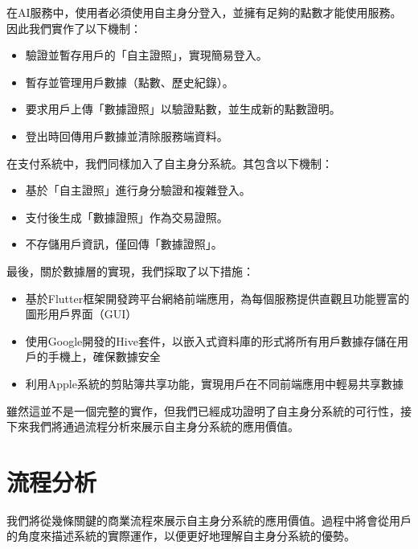 在AI服務中，使用者必須使用自主身分登入，並擁有足夠的點數才能使用服務。因此我們實作了以下機制：
\begin{itemize}
  \item 驗證並暫存用戶的「自主證照」，實現簡易登入。
  \item 暫存並管理用戶數據（點數、歷史紀錄）。
  \item 要求用戶上傳「數據證照」以驗證點數，並生成新的點數證明。
  \item 登出時回傳用戶數據並清除服務端資料。
\end{itemize}
在支付系統中，我們同樣加入了自主身分系統。其包含以下機制：
\begin{itemize}
  \item 基於「自主證照」進行身分驗證和複雜登入。
  \item 支付後生成「數據證照」作為交易證照。
  \item 不存儲用戶資訊，僅回傳「數據證照」。
\end{itemize}
最後，關於數據層的實現，我們採取了以下措施：
\begin{itemize}
  \item 基於Flutter框架開發跨平台網絡前端應用，為每個服務提供直觀且功能豐富的圖形用戶界面（GUI）
  \item 使用Google開發的Hive套件，以嵌入式資料庫的形式將所有用戶數據存儲在用戶的手機上，確保數據安全
  \item 利用Apple系統的剪貼簿共享功能，實現用戶在不同前端應用中輕易共享數據
\end{itemize}
雖然這並不是一個完整的實作，但我們已經成功證明了自主身分系統的可行性，接下來我們將通過流程分析來展示自主身分系統的應用價值。
\section{流程分析}
我們將從幾條關鍵的商業流程來展示自主身分系統的應用價值。過程中將會從用戶的角度來描述系統的實際運作，以便更好地理解自主身分系統的優勢。
